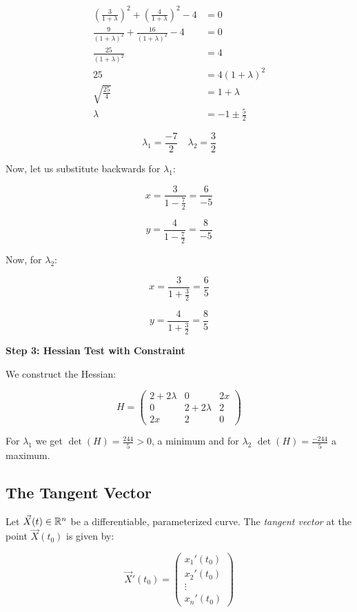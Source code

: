 \begin{align*}
    \left(\frac{3}{1 + \lambda}\right)^2 + \left(\frac{4}{1 + \lambda}\right)^2 - 4 &= 0\\
    \frac{9}{(1 + \lambda)^2} + \frac{16}{(1 + \lambda)^2} - 4 &= 0\\
    \frac{25}{(1 + \lambda)^2} &= 4 \\
    25 &= 4 (1 + \lambda)^2 \\
    \sqrt{\frac{25}{4}} &= 1 + \lambda \\
    \lambda &= -1 \pm \frac{5}{2}
\end{align*}

\[
    \lambda_1 = \frac{-7}{2} \quad \lambda_2 = \frac{3}{2}
\]


Now, let us substitute backwards for \(\lambda_1\):

\[
    x = \frac{3}{1 - \frac{7}{2}} = \frac{6}{-5}
\]

\[
    y = \frac{4}{1 - \frac{7}{2}} = \frac{8}{-5}
\]

Now,  for \(\lambda_2\):

\[
    x = \frac{3}{1 + \frac{3}{2}} = \frac{6}{5}
\]

\[
    y = \frac{4}{1 + \frac{3}{2}} = \frac{8}{5}
\]


\textbf{Step 3: Hessian Test with Constraint}

We construct the Hessian:

\[
    H = \begin{pmatrix}
    2 + 2\lambda & 0 & 2x \\
    0 & 2 + 2\lambda & 2 \\
    2x & 2 & 0
    \end{pmatrix}
\]

For \(\lambda_1\) we get \( \det(H) =  \frac{244}{5} > 0 \), a minimum 
and for \(\lambda_2\) \(\det(H) = \frac{-244}{5}\) a maximum.

\subsection{The Tangent Vector}

Let \( \vec{X}(t) \in \mathbb{R}^n \) be a differentiable, parameterized curve. The \emph{tangent vector} 
at the point \( \vec{X}(t_0) \) is given by:

\[
    \vec{X}'(t_0) = \begin{pmatrix}
        x_1 ' (t_0) \\ x_2 ' (t_0) \\ \vdots \\ x_n ' (t_0)
    \end{pmatrix}
\]

